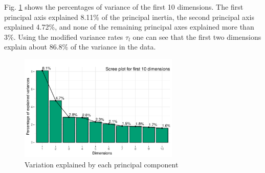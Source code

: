 \documentclass[conference]{IEEEtran}
\begin{document}
Fig. \ref{fig:screeplot} shows the percentages of variance of the first
10 dimensions. The first principal axis explained 8.11\% of the
principal inertia, the second principal axis explained 4.72\%, and none
of the remaining principal axes explained more than 3\%. Using the
modified variance rates \(\tau_l\) one can see that the first two
dimensions explain about 86.8\% of the variance in the data.

\begin{figure}[!ht] 
\centering
\includegraphics[width=3in]{../figs/screeplot.pdf}
\caption{Variation explained by each principal component}
\label{fig:screeplot} 
\end{figure}
\end{document}
